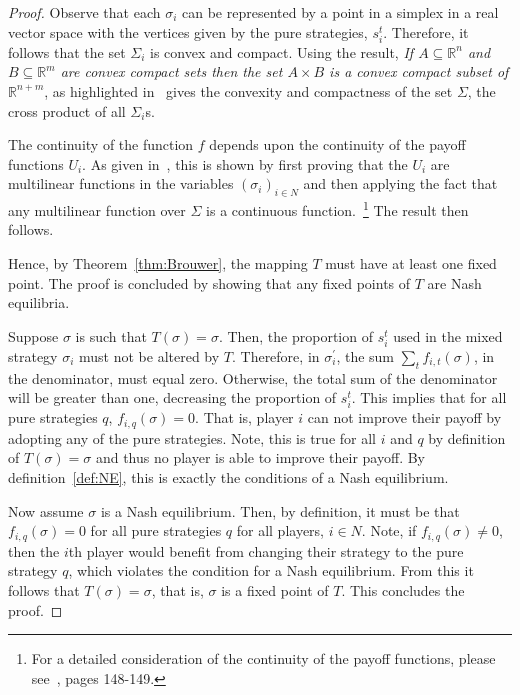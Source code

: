 \begin{proof}
    Observe that each \(\sigma_{i}\) can be represented by a point in a simplex
    in a real vector space with the vertices given by the pure strategies,
    \(s_{i}^{t}\). Therefore, it follows that the set \(\Sigma_{i}\) is convex
    and compact. Using the result, \textit{If \(A \subseteq \mathbb{R}^{n}\) and
    \(B \subseteq \mathbb{R}^{m}\) are convex compact sets then the set \(A
    \times B\) is a convex compact subset of \(\mathbb{R}^{n+m}\)}, as
    highlighted in~\cite{maschler_solan_zamir_2013} gives the convexity and
    compactness of the set \(\Sigma \), the cross product of all
    \(\Sigma_{i}\)s. 
    
    The continuity of the function \(f\) depends upon the continuity of the
    payoff functions \(U_{i}\). As given in~\cite{maschler_solan_zamir_2013},
    this is shown by first proving that the \(U_{i}\) are multilinear functions
    in the variables \((\sigma_{i})_{i \in N}\) and then applying the fact that
    any multilinear function over \(\Sigma \) is a continuous
    function.~\footnote{For a detailed consideration of the continuity of the
    payoff functions, please see~\cite{maschler_solan_zamir_2013}, pages
    148-149.} The result then follows.

    Hence, by Theorem~\ref{thm:Brouwer}, the mapping \(T\) must have at least
    one fixed point. The proof is concluded by showing that any fixed points of
    \(T\) are Nash equilibria. 

    Suppose \(\sigma \) is such that \(T(\sigma) = \sigma \). Then, the
    proportion of \(s_{i}^{t}\) used in the mixed strategy \(\sigma_{i}\) must
    not be altered by \(T\). Therefore, in \(\sigma_{i}^{\prime}\), the sum
    \(\sum_{t}{f_{i,t}(\sigma)}\), in the denominator, must equal zero.
    Otherwise, the total sum of the denominator will be greater than one,
    decreasing the proportion of \(s_{i}^{t}\). This implies that for all pure
    strategies \(q\), \(f_{i,q}(\sigma)=0\). That is, player \(i\) can not
    improve their payoff by adopting any of the pure strategies. Note, this is
    true for all \(i\) and \(q\) by definition of \(T(\sigma) = \sigma \) and
    thus no player is able to improve their payoff. By definition~\ref{def:NE},
    this is exactly the conditions of a Nash equilibrium.

    Now assume \(\sigma \) is a Nash equilibrium. Then, by definition, it must
    be that \(f_{i,q}(\sigma)=0\) for all pure strategies \(q\) for all players,
    \(i \in N\). Note, if \(f_{i,q}(\sigma) \ne 0\), then the
    \(i\)th player would benefit from changing their strategy to the pure
    strategy \(q\), which violates the condition for a Nash equilibrium. From
    this it follows that \(T(\sigma) = \sigma \), that is, \(\sigma \) is a
    fixed point of \(T\). This concludes the proof.

\end{proof}

